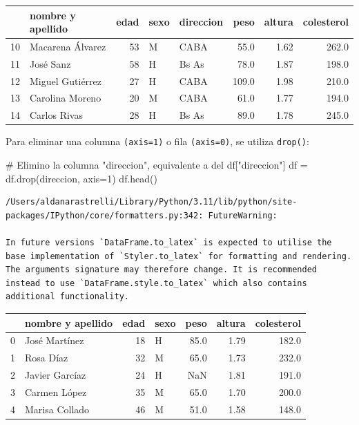 \documentclass[
  letterpaper,
  DIV=11,
  numbers=noendperiod]{scrreprt}
\newenvironment{Shaded}{\begin{snugshade}}{\end{snugshade}}
\newcommand{\CommentTok}[1]{\textcolor[rgb]{0.37,0.37,0.37}{#1}}
\newcommand{\DecValTok}[1]{\textcolor[rgb]{0.68,0.00,0.00}{#1}}
\newcommand{\NormalTok}[1]{\textcolor[rgb]{0.00,0.23,0.31}{#1}}
\newcommand{\OperatorTok}[1]{\textcolor[rgb]{0.37,0.37,0.37}{#1}}
\newcommand{\StringTok}[1]{\textcolor[rgb]{0.13,0.47,0.30}{#1}}
\begin{document}
\begin{tabular}{llrllrrr}
\toprule
{} & nombre y apellido &  edad & sexo & direccion &   peso &  altura &  colesterol \\
\midrule
10 &  Macarena Álvarez &    53 &    M &      CABA &   55.0 &    1.62 &       262.0 \\
11 &         José Sanz &    58 &    H &     Bs As &   78.0 &    1.87 &       198.0 \\
12 &  Miguel Gutiérrez &    27 &    H &      CABA &  109.0 &    1.98 &       210.0 \\
13 &   Carolina Moreno &    20 &    M &      CABA &   61.0 &    1.77 &       194.0 \\
14 &      Carlos Rivas &    28 &    H &     Bs As &   89.0 &    1.78 &       245.0 \\
\bottomrule
\end{tabular}

Para eliminar una columna \texttt{(axis=1)} o fila \texttt{(axis=0)}, se
utiliza \texttt{drop()}:

\begin{Shaded}
\begin{Highlighting}[]
\CommentTok{\# Elimino la columna "direccion", equivalente a del df["direccion"]}
\NormalTok{df }\OperatorTok{=}\NormalTok{ df.drop(}\StringTok{\textquotesingle{}direccion\textquotesingle{}}\NormalTok{, axis}\OperatorTok{=}\DecValTok{1}\NormalTok{)  }
\NormalTok{df.head()}
\end{Highlighting}
\end{Shaded}

\begin{verbatim}
/Users/aldanarastrelli/Library/Python/3.11/lib/python/site-packages/IPython/core/formatters.py:342: FutureWarning:

In future versions `DataFrame.to_latex` is expected to utilise the base implementation of `Styler.to_latex` for formatting and rendering. The arguments signature may therefore change. It is recommended instead to use `DataFrame.style.to_latex` which also contains additional functionality.
\end{verbatim}

\begin{tabular}{llrlrrr}
\toprule
{} & nombre y apellido &  edad & sexo &  peso &  altura &  colesterol \\
\midrule
0 &     José Martínez &    18 &    H &  85.0 &    1.79 &       182.0 \\
1 &         Rosa Díaz &    32 &    M &  65.0 &    1.73 &       232.0 \\
2 &    Javier Garcíaz &    24 &    H &   NaN &    1.81 &       191.0 \\
3 &      Carmen López &    35 &    M &  65.0 &    1.70 &       200.0 \\
4 &    Marisa Collado &    46 &    M &  51.0 &    1.58 &       148.0 \\
\bottomrule
\end{tabular}
\end{document}
